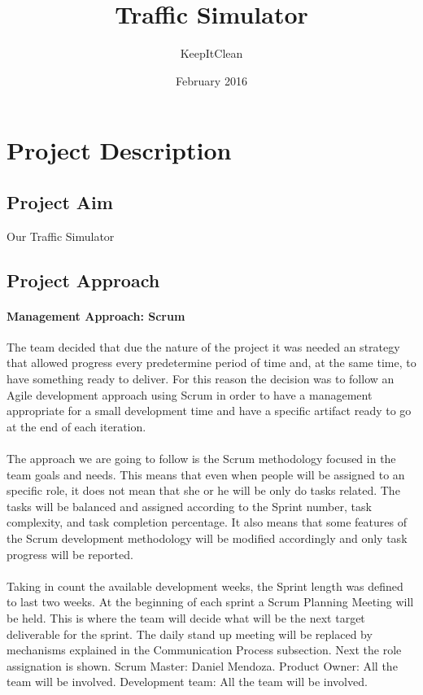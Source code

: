 \documentclass[11pt]{article}
\author{KeepItClean}
\title{Traffic Simulator}
\date{February 2016}
\begin{document}
\maketitle
\newpage

\section{Project Description}
\subsection{Project Aim}
Our Traffic Simulator 
\subsection{Project Approach}
	\paragraph{Management Approach: Scrum} The team decided that due the nature of the project it was needed an strategy that allowed progress every predetermine period of time and, at the same time, to have something ready to deliver. For this reason the decision was to follow an Agile development approach using Scrum in order to have a management appropriate for a small development time and  have a specific artifact ready to go at the end of each iteration.
	\paragraph{}The approach we are going to follow is the Scrum methodology focused in the team goals and needs. This means that even when people will be assigned to an specific role, it does not mean that she or he will be only do tasks related. The tasks will be balanced and assigned according to the Sprint number, task complexity, and task completion percentage. It also means that some features of the Scrum development methodology will be modified accordingly and only task progress will be reported.
	\paragraph{}Taking in count the available development weeks, the Sprint length was defined to last two weeks. At the beginning of each sprint a Scrum Planning Meeting will be held. This is where the team will decide what will be the next target deliverable for the sprint. The daily stand up meeting will be replaced by mechanisms explained in the Communication Process subsection.
	Next the role assignation is shown. Scrum Master: Daniel Mendoza. Product Owner: All the team will be involved. Development team: All the team will be involved.
\end{document}
